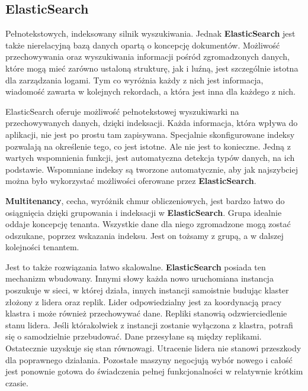 \subsection{ElasticSearch}
    Pełnotekstowych, indeksowany silnik wyszukiwania. Jednak \textbf{ElasticSearch} jest także
    nierelacyjną bazą danych opartą o koncepcję dokumentów. Możliwość przechowywania oraz wyszukiwania
    informacji pośród zgromadzonych danych, które mogą mieć zarówno ustaloną strukturę, jak i  luźną, jest
    szczególnie istotna dla zarządzania logami. Tym co wyróżnia każdy z nich jest informacja, wiadomość
    zawarta w kolejnych rekordach, a która jest inna dla każdego z nich. 
    
    ElasticSearch oferuje możliwość pełnotekstowej wyszukiwarki na przechowywanych danych, dzięki
    indeksacji. Każda informacja, która wpływa do aplikacji, nie jest po prostu tam zapisywana.
    Specjalnie skonfigurowane indeksy pozwalają na określenie tego, co jest istotne. Ale nie jest
    to konieczne. Jedną z wartych wspomnienia funkcji, jest automatyczna detekcja typów danych, na ich
    podstawie. Wspomniane indeksy są tworzone automatycznie, aby jak najszybciej można było
    wykorzystać możliwości oferowane przez \textbf{ElasticSearch}.
    
    \textbf{Multitenancy}, cecha, wyróżnik chmur obliczeniowych, jest bardzo łatwo do osiągnięcia
    dzięki grupowania i indeksacji w \textbf{ElasticSearch}. Grupa idealnie oddaje koncepcję tenanta.
    Wszystkie dane dla niego zgromadzone mogą zostać odszukane, poprzez wskazania indeksu. Jest on
    tożsamy z grupą, a w dalszej kolejności tenantem.
    
    Jest to także rozwiązania łatwo skalowalne. \textbf{ElasticSearch} posiada ten mechanizm wbudowany.
    Innymi słowy każda nowo uruchomiana instancja poszukuje w sieci, w której działa, innych instancji
    samoistnie budując klaster złożony z lidera oraz replik. 
    Lider odpowiedzialny jest za koordynacją pracy klastra i może również przechowywać dane.
    Repliki stanowią odzwierciedlenie stanu lidera. Jeśli którakolwiek z instancji zostanie wyłączona z klastra,
    potrafi się o samodzielnie przebudować. Dane przesyłane są między replikami. Ostatecznie uzyskuje się
    stan równowagi. Utracenie lidera nie stanowi przeszkody dla poprawnego działania. Pozostałe maszyny 
    negocjują wybór nowego i całość jest ponownie gotowa do świadczenia pełnej funkcjonalności w relatywnie
    krótkim czasie.
    
